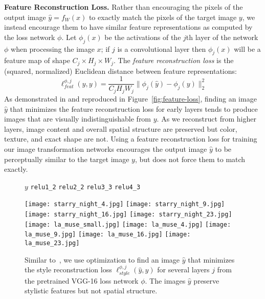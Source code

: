 \documentclass[runningheads]{llncs}
\begin{document}
\vspace{1mm}
\noindent\textbf{Feature Reconstruction Loss.}
Rather than encouraging the pixels of the output image $\hat y=f_W(x)$ to exactly match
the pixels of the target image $y$, we instead encourage them to have similar feature
representations as computed by the loss network $\phi$. Let $\phi_j(x)$ be the activations
of the $j$th layer of the network $\phi$ when processing the image $x$; if $j$ is a
convolutional layer then $\phi_j(x)$ will be a feature map of shape
$C_j \times H_j \times W_j$. The \emph{feature reconstruction loss} is
the (squared, normalized) Euclidean distance between feature representations:
\begin{equation}
  \ell_{feat}^{\phi,j}(\hat y, y) = 
  \frac1{C_jH_jW_j}\|\phi_j(\hat y) - \phi_j(y)\|_2^2
\end{equation}
As demonstrated in \cite{mahendran15understanding} and reproduced in
Figure~\ref{fig:feature-loss}, finding an image $\hat y$ that minimizes the feature
reconstruction loss for early layers tends to produce images that are visually
indistinguishable from $y$. As we reconstruct from higher layers, image content
and overall spatial structure are preserved but color, texture, and exact shape are not.
Using a feature reconstruction loss for training our image transformation networks encourages
the output image $\hat y$ to be perceptually similar to the target image $y$, but does not
force them to match exactly.



\begin{figure}[t]
  \hspace{11mm} $y$
  \hspace{15mm} \verb|relu1_2|
  \hspace{10mm} \verb|relu2_2|
  \hspace{10mm} \verb|relu3_3|
  \hspace{10mm} \verb|relu4_3|
  \vspace{-2.5mm}
  \begin{center}
    \texttt{[image: starry\_night\_4.jpg]}
    \texttt{[image: starry\_night\_9.jpg]}
    \texttt{[image: starry\_night\_16.jpg]}
    \texttt{[image: starry\_night\_23.jpg]} \\
    \texttt{[image: la\_muse\_small.jpg]}
    \texttt{[image: la\_muse\_4.jpg]}
    \texttt{[image: la\_muse\_9.jpg]}
    \texttt{[image: la\_muse\_16.jpg]}
    \texttt{[image: la\_muse\_23.jpg]}
  \end{center}
  \vspace{-5mm}
  \caption{Similar to~\cite{gatys2015neural}, we use optimization to find an image $\hat y$
    that minimizes the style reconstruction loss $\ell_{style}^{\phi, j}(\hat y, y)$
    for several layers $j$ from the pretrained VGG-16 loss network $\phi$. The images
    $\hat y$ preserve stylistic features but not spatial structure.
  }
  \label{fig:style-loss}
\end{figure}
\end{document}
